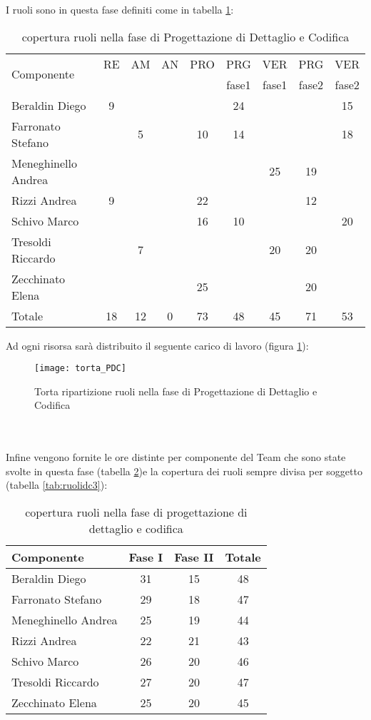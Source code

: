 I ruoli sono in questa fase definiti come in tabella \ref{tab:ruolidc}:\\
\begin{table}[h!]
\centering
\begin{tabular}{|l|c|c|c|c|c|c|c|c|}
\hline
\multirow{2}{*}{Componente}& RE& AM& AN& PRO& PRG&VER& PRG& VER \\
					      &    &     &      &        & fase1&fase1&fase2&fase2\\
\hline
Beraldin Diego & 9& & & & 24& & & 15\\
Farronato Stefano & & 5& & 10&14 & & & 18\\
Meneghinello Andrea & & & & & & 25& 19& \\
Rizzi Andrea & 9& & & 22& & & 12& \\
Schivo Marco & & & & 16& 10& & & 20\\
Tresoldi Riccardo & & 7& & & & 20& 20& \\
Zecchinato Elena & & & & 25& & & 20& \\
\hline
Totale & 18& 12& 0& 73& 48& 45& 71& 53\\
\hline
\end{tabular}
\caption{copertura ruoli nella fase di Progettazione di Dettaglio e Codifica}\label{tab:ruolidc}
\end{table}
\clearpage
Ad ogni risorsa sarà distribuito il seguente carico di lavoro (figura \ref{fig:ruolidc}):\\
\begin{figure}[h!]
\centering
  \texttt{[image: torta\_PDC]}
\caption{Torta ripartizione ruoli nella fase di Progettazione di Dettaglio e Codifica}\label{fig:ruolidc}
\end{figure}
\\\\
Infine vengono fornite le ore distinte per componente del Team che sono state svolte in questa fase (tabella \ref{tab:ruolidc2})e la copertura dei ruoli sempre divisa per soggetto (tabella \ref{tab:ruolidc3}):\\
\begin{table}[h]
\centering
\begin{tabular}{|l|c|c|c|}
\hline
Componente& Fase I& Fase II& Totale\\
\hline
Beraldin Diego & 31& 15& 48\\
Farronato Stefano & 29& 18& 47\\
Meneghinello Andrea & 25& 19& 44\\
Rizzi Andrea &22 &21 & 43\\
Schivo Marco & 26& 20& 46\\
Tresoldi Riccardo & 27& 20& 47\\
Zecchinato Elena & 25& 20& 45\\
\hline
\end{tabular}
\caption{copertura ruoli nella fase di progettazione di dettaglio e codifica}\label{tab:ruolidc2}
\end{table}

